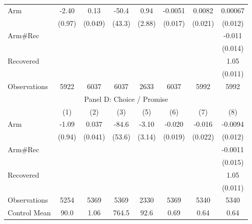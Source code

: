 \begin{tabular}{lccccccc}
\midrule
\midrule
Arm   & -2.40 & 0.13  & -50.4 & 0.94  & -0.0051 & 0.0082 & 0.00067 \\
      & (0.97) & (0.049) & (43.3) & (2.88) & (0.017) & (0.021) & (0.012) \\
Arm\#Rec &       &       &       &       &       &       & -0.011 \\
      &       &       &       &       &       &       & (0.014) \\
Recovered &       &       &       &       &       &       & 1.05 \\
      &       &       &       &       &       &       & (0.011) \\
\midrule
Observations & 5922  & 6037  & 6037  & 2633  & 6037  & 5992  & 5992 \\
\midrule
\multicolumn{8}{c}{Panel D: Choice / Promise} \\
\midrule
\midrule
      & (1)   & (2)   & (3)   & (5)   & (6)   & (7)   & (8) \\
\midrule
\midrule
Arm   & -1.09 & 0.037 & -84.6 & -3.10 & -0.020 & -0.016 & -0.0094 \\
      & (0.94) & (0.041) & (53.6) & (3.14) & (0.019) & (0.022) & (0.012) \\
Arm\#Rec &       &       &       &       &       &       & -0.0011 \\
      &       &       &       &       &       &       & (0.015) \\
Recovered &       &       &       &       &       &       & 1.05 \\
      &       &       &       &       &       &       & (0.011) \\
\midrule
Observations & 5254  & 5369  & 5369  & 2330  & 5369  & 5340  & 5340 \\
\midrule
\midrule
Control Mean & 90.0  & 1.06  & 764.5 & 92.6  & 0.69  & 0.64  & 0.64 \\
\bottomrule
\bottomrule
\end{tabular}%
